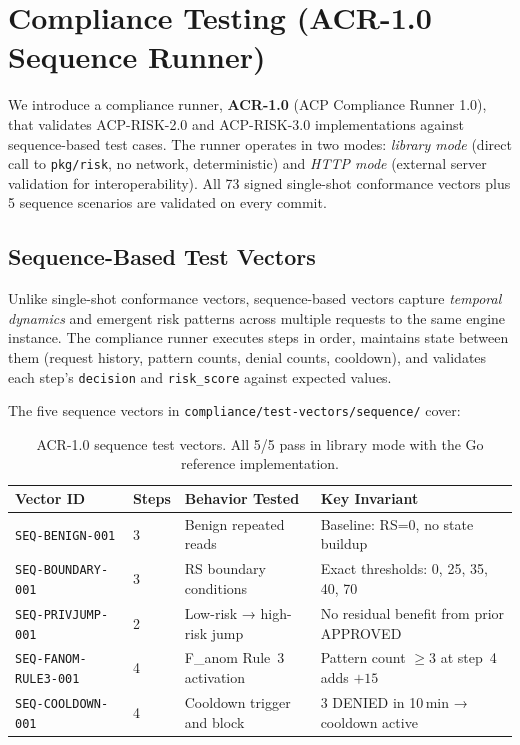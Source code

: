 \documentclass[11pt]{article}
\theoremstyle{definition}
\begin{document}
\section{Compliance Testing (ACR-1.0 Sequence Runner)}
\label{sec:compliance-testing}

We introduce a compliance runner, \textbf{ACR-1.0} (ACP Compliance Runner 1.0), that validates ACP-RISK-2.0 and ACP-RISK-3.0 implementations
against sequence-based test cases.
The runner operates in two modes: \emph{library mode} (direct call to \texttt{pkg/risk},
no network, deterministic) and \emph{HTTP mode} (external server validation for interoperability).
All 73 signed single-shot conformance vectors plus 5 sequence scenarios
are validated on every commit.

\subsection{Sequence-Based Test Vectors}

Unlike single-shot conformance vectors, sequence-based vectors capture \emph{temporal dynamics}
and emergent risk patterns across multiple requests to the same engine instance.
The compliance runner executes steps in order, maintains state between them
(request history, pattern counts, denial counts, cooldown),
and validates each step's \texttt{decision} and \texttt{risk\_score} against expected values.

The five sequence vectors in \texttt{compliance/test-vectors/sequence/} cover:

\begin{table}[h!]
\centering
\small
\begin{tabular}{@{}llll@{}}
\toprule
\textbf{Vector ID} & \textbf{Steps} & \textbf{Behavior Tested} & \textbf{Key Invariant} \\
\midrule
\texttt{SEQ-BENIGN-001}         & 3 & Benign repeated reads          & Baseline: RS=0, no state buildup \\
\texttt{SEQ-BOUNDARY-001}       & 3 & RS boundary conditions          & Exact thresholds: 0, 25, 35, 40, 70 \\
\texttt{SEQ-PRIVJUMP-001}       & 2 & Low-risk → high-risk jump       & No residual benefit from prior APPROVED \\
\texttt{SEQ-FANOM-RULE3-001}    & 4 & F\_anom Rule~3 activation       & Pattern count $\geq 3$ at step~4 adds $+15$ \\
\texttt{SEQ-COOLDOWN-001}       & 4 & Cooldown trigger and block      & 3 DENIED in 10\,min → cooldown active \\
\bottomrule
\end{tabular}
\caption{ACR-1.0 sequence test vectors. All 5/5 pass in library mode with the Go reference implementation.}
\end{table}
\end{document}
